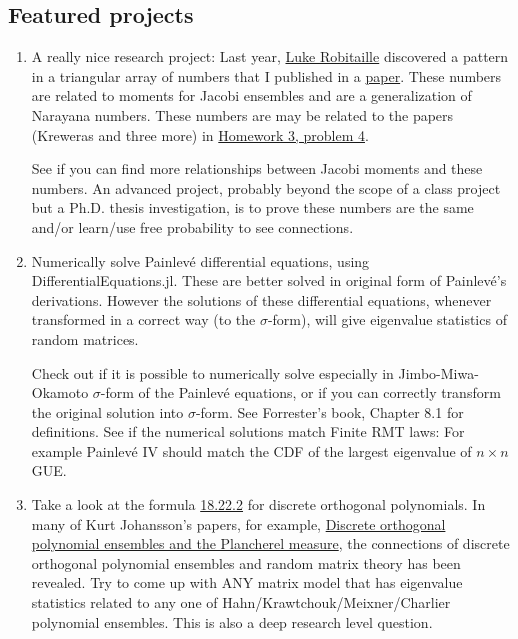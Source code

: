 \documentclass{article}
\begin{document}
\subsection*{Featured projects}
\begin{enumerate}
\item  A really nice research project: Last year, \href{https://github.com/mitmath/18338/blob/master/projects/2022/lr_report.pdf}{\color{blue}Luke Robitaille} discovered a pattern in a triangular array of numbers that I published in a \href{https://www.sciencedirect.com/science/article/pii/S0024379514007307}{\color{blue}paper}. These numbers are related to moments for Jacobi ensembles and are a generalization of Narayana numbers. These numbers are may be related to the papers (Kreweras and three more) in \href{https://github.com/mitmath/18338/blob/master/homeworks/fall2023hw3.pdf}{\color{blue}Homework 3, problem 4}. 

See if you can find more relationships between Jacobi moments and these numbers. An advanced project, probably beyond the scope of a class project but a Ph.D. thesis investigation, is to prove these numbers are the same and/or learn/use free probability to see connections.

\item Numerically solve Painlev{\'e} differential equations, using DifferentialEquations.jl. These are better solved in original form of Painlev{\'e}'s derivations. However the solutions of these differential equations, whenever transformed in a correct way (to the $\sigma$-form), will give eigenvalue statistics of random matrices. 

Check out if it is possible to numerically solve especially in Jimbo-Miwa-Okamoto $\sigma$-form of the Painlev{\'e} equations, or if you can correctly transform the original solution into $\sigma$-form. See Forrester's book, Chapter 8.1 for definitions. See if the numerical solutions match Finite RMT laws: For example Painlev{\'e} IV should match the CDF of the largest eigenvalue of $n\times n$ GUE. 

\item Take a look at the formula \href{http://dlmf.nist.gov/18.22#E2}{\color{blue}18.22.2} for discrete orthogonal polynomials. In many of Kurt Johansson's papers, for example, \href{https://www.jstor.org/stable/2661375}{\color{blue} Discrete orthogonal polynomial ensembles and the Plancherel measure}, the connections of discrete orthogonal polynomial ensembles and random matrix theory has been revealed. Try to come up with ANY matrix model that has eigenvalue statistics related to any one of Hahn/Krawtchouk/Meixner/Charlier polynomial ensembles. This is also a deep research level question. 
\end{enumerate}
\end{document}

